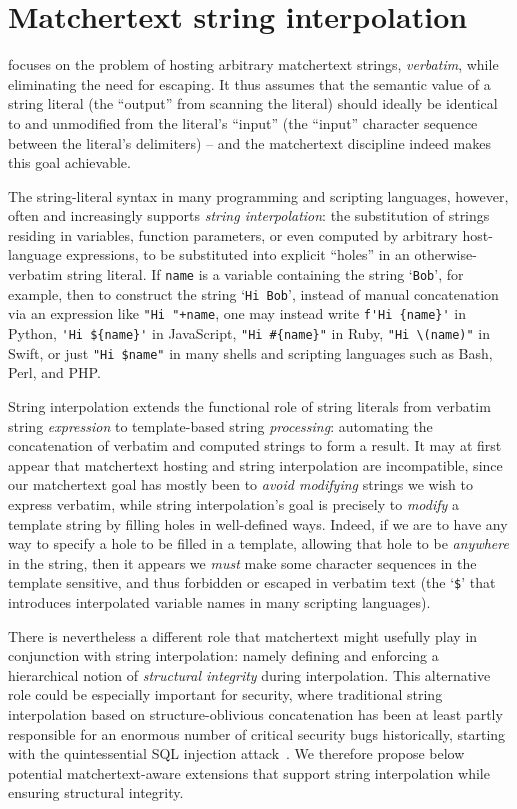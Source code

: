 \section{Matchertext string interpolation}
\label{app:interp}

 focuses on the problem of
hosting arbitrary matchertext strings, \emph{verbatim},
while eliminating the need for escaping.
It thus assumes that the semantic value of a string literal
(the ``output'' from scanning the literal)
should ideally be identical to and unmodified from the literal's ``input''
(the ``input'' character sequence between the literal's delimiters) --
and the matchertext discipline indeed makes this goal achievable.

The string-literal syntax in many programming and scripting languages,
however,
often and increasingly supports \emph{string interpolation}:
the substitution of strings residing in variables, function parameters,
or even computed by arbitrary host-language expressions,
to be substituted into explicit ``holes''
in an otherwise-verbatim string literal.
If \verb|name| is a variable containing the string `\verb|Bob|',
for example,
then to construct the string `\verb|Hi Bob|',
instead of manual concatenation via an expression like
\verb|"Hi "+name|,
one may instead write
\verb|f'Hi {name}'| in Python,
\verb|'Hi ${name}'| in JavaScript,
\verb|"Hi #{name}"| in Ruby,
\verb|"Hi \(name)"| in Swift,
or just
\verb|"Hi $name"| in many shells and scripting languages
such as Bash, Perl, and PHP.

String interpolation extends the functional role of string literals
from verbatim string \emph{expression}
to template-based string \emph{processing}:
automating the concatenation of verbatim and computed strings
to form a result.
It may at first appear that matchertext hosting and string interpolation
are incompatible,
since our matchertext goal has mostly been to \emph{avoid modifying}
strings we wish to express verbatim,
while string interpolation's goal is precisely to \emph{modify}
a template string by filling holes in well-defined ways.
Indeed, if we are to have any way to specify
a hole to be filled in a template,
allowing that hole to be \emph{anywhere} in the string,
then it appears we \emph{must} make some character sequences in the template
sensitive, and thus forbidden or escaped in verbatim text
(\eg the `\verb|$|' that introduces interpolated variable names
in many scripting languages).

There is nevertheless a different role that matchertext might usefully play
in conjunction with string interpolation:
namely defining and enforcing a hierarchical notion of
\emph{structural integrity} during interpolation.
This alternative role could be especially important for security,
where traditional string interpolation
based on structure-oblivious concatenation
has been at least partly responsible for an enormous number
of critical security bugs historically,
starting with the quintessential SQL injection attack~\cite{clarke12sql}.
We therefore propose below potential matchertext-aware extensions
that support string interpolation while ensuring structural integrity.

